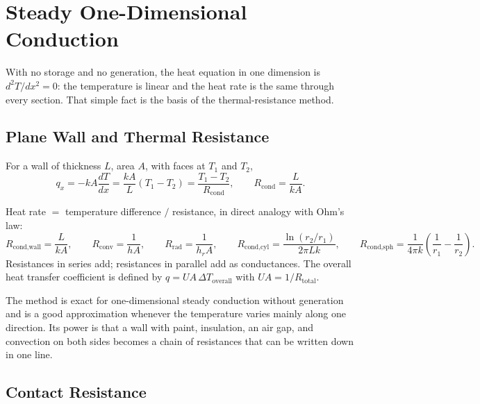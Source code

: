 \section*{Steady One-Dimensional Conduction}

With no storage and no generation, the heat equation in one dimension is $d^2T/dx^2 = 0$: the temperature is linear and the heat rate is the same through every section. That simple fact is the basis of the thermal-resistance method.

\subsection*{Plane Wall and Thermal Resistance}

For a wall of thickness $L$, area $A$, with faces at $T_1$ and $T_2$,
\[
q_x = -kA\frac{dT}{dx} = \frac{kA}{L}(T_1 - T_2) = \frac{T_1 - T_2}{R_{\text{cond}}},
\qquad R_{\text{cond}} = \frac{L}{kA}.
\]

\begin{definition}
Heat rate $=$ temperature difference $/$ resistance, in direct analogy with Ohm's law:
\[
R_{\text{cond,wall}} = \frac{L}{kA},\qquad
R_{\text{conv}} = \frac{1}{hA},\qquad
R_{\text{rad}} = \frac{1}{h_r A},\qquad
R_{\text{cond,cyl}} = \frac{\ln(r_2/r_1)}{2\pi L k},\qquad
R_{\text{cond,sph}} = \frac{1}{4\pi k}\left(\frac{1}{r_1} - \frac{1}{r_2}\right).
\]
Resistances in series add; resistances in parallel add as conductances. The overall heat transfer coefficient is defined by $q = UA\,\Delta T_{\text{overall}}$ with $UA = 1/R_{\text{total}}$.
\end{definition}

The method is exact for one-dimensional steady conduction without generation and is a good approximation whenever the temperature varies mainly along one direction. Its power is that a wall with paint, insulation, an air gap, and convection on both sides becomes a chain of resistances that can be written down in one line.

\subsection*{Contact Resistance}

